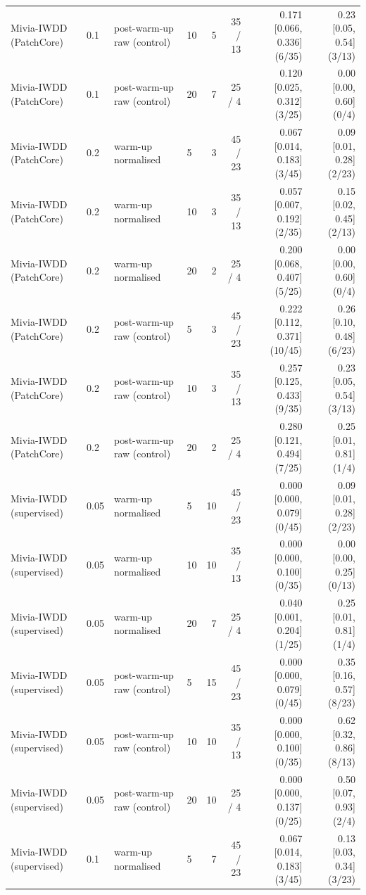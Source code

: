 \begin{table}[t]
{\begin{tabular}{llllrrrr}
Mivia-IWDD (PatchCore) & 0.1 & post-warm-up raw (control) & 10 & 5 & 35 / 13 & 0.171 [0.066, 0.336] (6/35) & 0.23 [0.05, 0.54] (3/13) \\
Mivia-IWDD (PatchCore) & 0.1 & post-warm-up raw (control) & 20 & 7 & 25 / 4 & 0.120 [0.025, 0.312] (3/25) & 0.00 [0.00, 0.60] (0/4) \\
Mivia-IWDD (PatchCore) & 0.2 & warm-up normalised & 5 & 3 & 45 / 23 & 0.067 [0.014, 0.183] (3/45) & 0.09 [0.01, 0.28] (2/23) \\
Mivia-IWDD (PatchCore) & 0.2 & warm-up normalised & 10 & 3 & 35 / 13 & 0.057 [0.007, 0.192] (2/35) & 0.15 [0.02, 0.45] (2/13) \\
Mivia-IWDD (PatchCore) & 0.2 & warm-up normalised & 20 & 2 & 25 / 4 & 0.200 [0.068, 0.407] (5/25) & 0.00 [0.00, 0.60] (0/4) \\
Mivia-IWDD (PatchCore) & 0.2 & post-warm-up raw (control) & 5 & 3 & 45 / 23 & 0.222 [0.112, 0.371] (10/45) & 0.26 [0.10, 0.48] (6/23) \\
Mivia-IWDD (PatchCore) & 0.2 & post-warm-up raw (control) & 10 & 3 & 35 / 13 & 0.257 [0.125, 0.433] (9/35) & 0.23 [0.05, 0.54] (3/13) \\
Mivia-IWDD (PatchCore) & 0.2 & post-warm-up raw (control) & 20 & 2 & 25 / 4 & 0.280 [0.121, 0.494] (7/25) & 0.25 [0.01, 0.81] (1/4) \\
Mivia-IWDD (supervised) & 0.05 & warm-up normalised & 5 & 10 & 45 / 23 & 0.000 [0.000, 0.079] (0/45) & 0.09 [0.01, 0.28] (2/23) \\
Mivia-IWDD (supervised) & 0.05 & warm-up normalised & 10 & 10 & 35 / 13 & 0.000 [0.000, 0.100] (0/35) & 0.00 [0.00, 0.25] (0/13) \\
Mivia-IWDD (supervised) & 0.05 & warm-up normalised & 20 & 7 & 25 / 4 & 0.040 [0.001, 0.204] (1/25) & 0.25 [0.01, 0.81] (1/4) \\
Mivia-IWDD (supervised) & 0.05 & post-warm-up raw (control) & 5 & 15 & 45 / 23 & 0.000 [0.000, 0.079] (0/45) & 0.35 [0.16, 0.57] (8/23) \\
Mivia-IWDD (supervised) & 0.05 & post-warm-up raw (control) & 10 & 10 & 35 / 13 & 0.000 [0.000, 0.100] (0/35) & 0.62 [0.32, 0.86] (8/13) \\
Mivia-IWDD (supervised) & 0.05 & post-warm-up raw (control) & 20 & 10 & 25 / 4 & 0.000 [0.000, 0.137] (0/25) & 0.50 [0.07, 0.93] (2/4) \\
Mivia-IWDD (supervised) & 0.1 & warm-up normalised & 5 & 7 & 45 / 23 & 0.067 [0.014, 0.183] (3/45) & 0.13 [0.03, 0.34] (3/23) \\

\end{tabular}}
\end{table}
